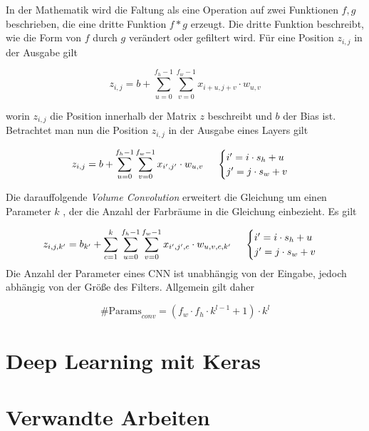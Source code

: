 In der Mathematik wird die Faltung als eine Operation auf zwei Funktionen $f,g$ beschrieben, die eine dritte Funktion $f * g$ erzeugt. Die dritte Funktion beschreibt, wie die Form von $f$ durch $g$ verändert oder gefiltert wird. Für eine Position $ z_{ i,j } $ in der Ausgabe gilt

\begin{equation}
	z_{i,j}=b+\sum_{u=0}^{f_{h}-1}\sum_{v=0}^{f_{w}-1}{x_{i+u,j+v}\cdot w_{u,v}}
\end{equation}

worin $z_{i,j}$ die Position innerhalb der Matrix $z$ beschreibt und $b$ der \gls{Bias} ist. Betrachtet man nun die Position $z_{i,j}$ in der Ausgabe eines Layers gilt 

\begin{equation}
	z_{i,j}=b+\sum_{u=0}^{f_{h}-1}\sum_{v=0}^{f_{w}-1}{x_{i',j'}\cdot w_{u,v}}\text{  \space\space\space    } \begin{cases}
	i' = i \cdot s_{h} + u \\ j' = j \cdot s_{w} + v 
\end{cases}
\end{equation}

Die darauffolgende \emph{Volume Convolution} erweitert die Gleichung um einen Parameter $k$ , der die Anzahl der Farbräume in die Gleichung einbezieht. Es gilt
	
\begin{equation}
	z_{i,j,k'}=b_{k'}+\sum_{c=1}^k{}\sum_{u=0}^{f_{h}-1}\sum_{v=0}^{f_{w}-1}{x_{i',j',c}\cdot w_{u,v,c,k'}}\text{  \space\space\space    } \begin{cases}
	i' = i \cdot s_{h} + u \\ j' = j \cdot s_{w} + v 
\end{cases}
\end{equation}
Die Anzahl der Parameter eines \ac{CNN} ist unabhängig von der Eingabe, jedoch abhängig von der Größe des Filters. Allgemein gilt daher 

\begin{equation}
	\text{\#{ }Params}_{conv} = (f_{w} \cdot f_{h} \cdot k^{l-1} + 1) \cdot k^l
\end{equation}








\section{Deep Learning mit Keras}

\section{Verwandte Arbeiten}

